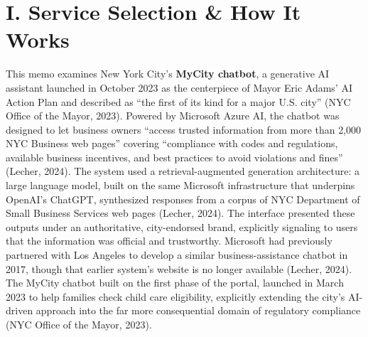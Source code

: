 \documentclass[10pt, twocolumn]{article}
\begin{document}

\section*{I. Service Selection \& How It Works}

This memo examines New York City's \textbf{MyCity chatbot}, a generative AI assistant launched in October 2023 as the centerpiece of Mayor Eric Adams' AI Action Plan and described as ``the first of its kind for a major U.S. city'' (NYC Office of the Mayor, 2023). Powered by Microsoft Azure AI, the chatbot was designed to let business owners ``access trusted information from more than 2,000 NYC Business web pages'' covering ``compliance with codes and regulations, available business incentives, and best practices to avoid violations and fines'' (Lecher, 2024). The system used a retrieval-augmented generation architecture: a large language model, built on the same Microsoft infrastructure that underpins OpenAI's ChatGPT, synthesized responses from a corpus of NYC Department of Small Business Services web pages (Lecher, 2024). The interface presented these outputs under an authoritative, city-endorsed brand, explicitly signaling to users that the information was official and trustworthy. Microsoft had previously partnered with Los Angeles to develop a similar business-assistance chatbot in 2017, though that earlier system's website is no longer available (Lecher, 2024). The MyCity chatbot built on the first phase of the portal, launched in March 2023 to help families check child care eligibility, explicitly extending the city's AI-driven approach into the far more consequential domain of regulatory compliance (NYC Office of the Mayor, 2023).
\end{document}
